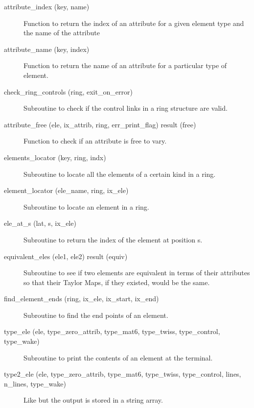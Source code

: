 \begin{description}

\item[attribute\_index (key, name)] \Newline
Function to return the index of an attribute for a given element 
type and the name of the attribute 

\item[attribute\_name (key, index)] \Newline
Function to return the name of an attribute for a particular type of element. 

\item[check\_ring\_controls (ring, exit\_on\_error)] \Newline
Subroutine to check if the control links in a ring structure are valid. 

\item[attribute\_free (ele, ix\_attrib, ring, err\_print\_flag) result (free)] \Newline
Function to check if an attribute is free to vary.

\item[elements\_locator (key, ring, indx)] \Newline
Subroutine to locate all the elements of a certain kind in a ring. 

\item[element\_locator (ele\_name, ring, ix\_ele)] \Newline
Subroutine to locate an element in a ring. 

\item[ele\_at\_s (lat, s, ix\_ele)] \Newline 
Subroutine to return the index of the element at position s.

\item[equivalent\_eles (ele1, ele2) result (equiv)] \Newline 
Subroutine to see if two elements are equivalent in terms of their attributes so
that their Taylor Maps, if they existed, would be the same.

\item[find\_element\_ends (ring, ix\_ele, ix\_start, ix\_end)] \Newline
Subroutine to find the end points of an element. 

\item[type\_ele (ele, type\_zero\_attrib, type\_mat6, type\_twiss, 
type\_control, type\_wake)] \Newline
Subroutine to print the contents of an element at the terminal. 

\item[type2\_ele (ele, type\_zero\_attrib, type\_mat6, type\_twiss, 
type\_control, lines, n\_lines, type\_wake)] \Newline
Like  but the output is stored in a string array. 


\end{description}
